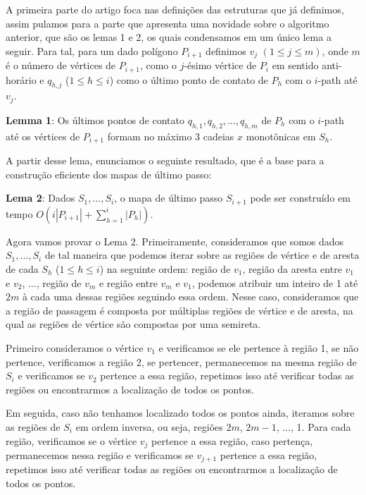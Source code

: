 \documentclass[11pt]{article}
\newenvironment{blockQuote}[1][lightgray]{\begin{mdframed}[
	leftline=true,
	topline=false,
	bottomline=false,
	rightline=false,
	linecolor=gray,
	linewidth=2pt,
	backgroundcolor=#1,
	skipabove=\baselineskip,
	skipbelow=\baselineskip,
	innerleftmargin=10pt,
	innerrightmargin=10pt,
	innertopmargin=5pt,
	innerbottommargin=5pt]
}
{\end{mdframed}}
\begin{document}
A primeira parte do artigo foca nas definições das estruturas que já definimos, assim pulamos para a parte que apresenta uma novidade sobre o algoritmo anterior, que são os lemas 1 e 2, os quais condensamos em um único lema a seguir. Para tal, para um dado polígono \(P_{i + 1}\) definimos \(v_j\) \((1 \le j \le m)\), onde \(m\) é o número de vértices de \(P_{i + 1}\), como o \(j\)-ésimo vértice de \(P_i\) em sentido anti-horário e \(q_{h,j}\) (\(1 \le h \le i\)) como o último ponto de contato de \(P_h\) com o \(i\)-path até \(v_j\).

\begin{blockQuote}
	\textbf{Lemma 1}: Os últimos pontos de contato \(q_{h,1}, q_{h,2}, \dots, q_{h,m}\) de \(P_h\) com o \(i\)-path até os vértices de \(P_{i + 1}\) formam no máximo 3 cadeias \(x\) monotônicas em \(S_h\).
\end{blockQuote}

A partir desse lema, enunciamos o seguinte resultado, que é a base para a construção eficiente dos mapas de último passo:

\begin{blockQuote}
	\textbf{Lema 2}: Dados \(S_1, \dots, S_i\), o mapa de último passo \(S_{i + 1}\) pode ser construído em tempo \(O(i|P_{i + 1}| + \sum_{h=1}^{i} |P_h|)\).
\end{blockQuote}

Agora vamos provar o Lema 2. Primeiramente, consideramos que somos dados \(S_1, \dots, S_i\) de tal maneira que podemos iterar sobre as regiões de vértice e de aresta de cada \(S_h\) (\(1 \le h \le i\)) na seguinte ordem: região de \(v_1\), região da aresta entre \(v_1\) e \(v_2\), \(\dots\), região de \(v_m\) e região entre \(v_m\) e \(v_1\), podemos atribuir um inteiro de 1 até \(2m\) à cada uma dessas regiões seguindo essa ordem. Nesse caso, consideramos que a região de passagem é composta por múltiplas regiões de vértice e de aresta, na qual as regiões de vértice são compostas por uma semireta.

Primeiro consideramos o vértice \(v_1\) e verificamos se ele pertence à região 1, se não pertence, verificamos a região 2, se pertencer, permanecemos na mesma região de \(S_i\) e verificamos se \(v_2\) pertence a essa região, repetimos isso até verificar todas as regiões ou encontrarmos a localização de todos os pontos.

Em seguida, caso não tenhamos localizado todos os pontos ainda, iteramos sobre as regiões de \(S_i\) em ordem inversa, ou seja, regiões \(2m\), \(2m - 1\), \(\dots\), 1. Para cada região, verificamos se o vértice \(v_j\) pertence a essa região, caso pertença, permanecemos nessa região e verificamos se \(v_{j + 1}\) pertence a essa região, repetimos isso até verificar todas as regiões ou encontrarmos a localização de todos os pontos.
\end{document}
